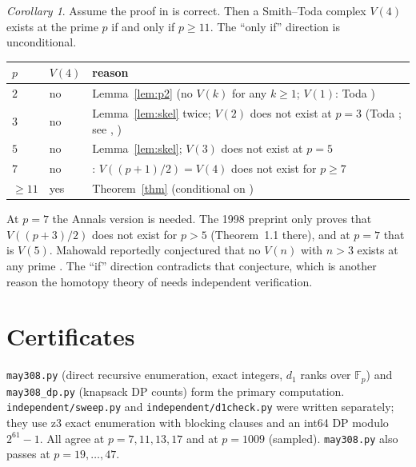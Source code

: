 \documentclass[11pt]{amsart}
\theoremstyle{remark}
\newtheorem{corollary}[theorem]{Corollary}
\begin{document}
\begin{corollary}\label{cor:class}
Assume the proof in \cite{OAI308} is correct. Then a Smith--Toda complex $V(4)$ exists at the prime $p$ if and only if $p\ge11$.
The ``only if'' direction is unconditional.
\end{corollary}
\begin{center}
\begin{tabular}{lll}
\toprule
$p$ & $V(4)$ & reason\\\midrule
$2$ & no & Lemma~\ref{lem:p2} (no $V(k)$ for any $k\ge1$; $V(1)$: Toda \cite{Toda})\\
$3$ & no & Lemma~\ref{lem:skel} twice; $V(2)$ does not exist at $p=3$ (Toda \cite{Toda}; see \cite[p.~493]{Nave}, \cite[\S1.3]{Rav})\\
$5$ & no & Lemma~\ref{lem:skel}; $V(3)$ does not exist at $p=5$ \cite[Theorem~7.6.1]{Rav}\\
$7$ & no & \cite[Theorem~1.3]{Nave}: $V((p+1)/2)=V(4)$ does not exist for $p\ge7$\\
$\ge11$ & yes & Theorem~\ref{thm} (conditional on \cite{OAI308})\\\bottomrule
\end{tabular}
\end{center}
At $p=7$ the Annals version is needed. The 1998 preprint \cite{Nave98} only proves that $V((p+3)/2)$ does not exist for $p>5$
(Theorem~1.1 there), and at $p=7$ that is $V(5)$. Mahowald reportedly conjectured that no $V(n)$ with $n>3$ exists at any prime
\cite{Salch}. The ``if'' direction contradicts that conjecture, which is another reason the homotopy theory of \cite{OAI308}
needs independent verification.

\section{Certificates}
\texttt{may308.py} (direct recursive enumeration, exact integers, $d_1$ ranks over $\mathbb F_p$) and
\texttt{may308\_dp.py} (knapsack DP counts) form the primary computation. \texttt{independent/sweep.py} and
\texttt{independent/d1check.py} were written separately; they use z3 exact enumeration with blocking clauses
and an int64 DP modulo $2^{61}-1$. All agree at $p=7,11,13,17$ and at $p=1009$ (sampled). \texttt{may308.py}
also passes at $p=19,\dots,47$.
\end{document}
